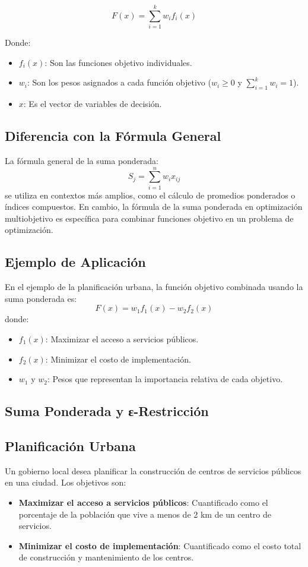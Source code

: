 \documentclass[12pt]{article}
\begin{document}
\[
F(x) = \sum_{i=1}^k w_i f_i(x)
\]

Donde:
\begin{itemize}
	\item \( f_i(x) \): Son las funciones objetivo individuales.
	\item \( w_i \): Son los pesos asignados a cada función objetivo (\( w_i \geq 0 \) y \( \sum_{i=1}^k w_i = 1 \)).
	\item \( x \): Es el vector de variables de decisión.
\end{itemize}

\subsection*{Diferencia con la Fórmula General}
La fórmula general de la suma ponderada:
\[
S_j = \sum_{i=1}^n w_i x_{ij}
\]
se utiliza en contextos más amplios, como el cálculo de promedios ponderados o índices compuestos. En cambio, la fórmula de la suma ponderada en optimización multiobjetivo es específica para combinar funciones objetivo en un problema de optimización.

\subsection*{Ejemplo de Aplicación}
En el ejemplo de la planificación urbana, la función objetivo combinada usando la suma ponderada es:
\[
F(x) = w_1 f_1(x) - w_2 f_2(x)
\]
donde:
\begin{itemize}
	\item \( f_1(x) \): Maximizar el acceso a servicios públicos.
	\item \( f_2(x) \): Minimizar el costo de implementación.
	\item \( w_1 \) y \( w_2 \): Pesos que representan la importancia relativa de cada objetivo.
\end{itemize}

\subsection*{Suma Ponderada y ε-Restricción}
\subsection*{Planificación Urbana}
Un gobierno local desea planificar la construcción de centros de servicios públicos en una ciudad. Los objetivos son:
\begin{itemize}
	\item \textbf{Maximizar el acceso a servicios públicos}: Cuantificado como el porcentaje de la población que vive a menos de 2 km de un centro de servicios.
	\item \textbf{Minimizar el costo de implementación}: Cuantificado como el costo total de construcción y mantenimiento de los centros.
\end{itemize}
\end{document}
